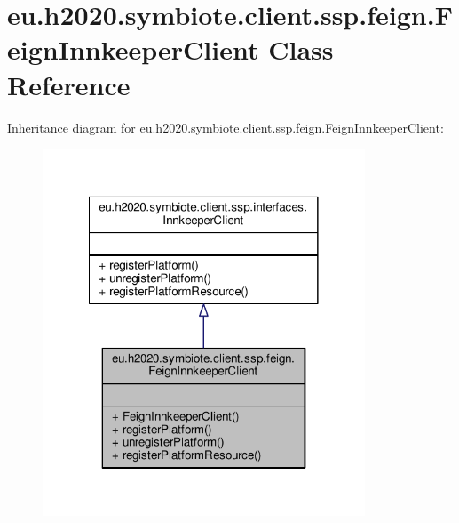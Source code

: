 \hypertarget{classeu_1_1h2020_1_1symbiote_1_1client_1_1ssp_1_1feign_1_1FeignInnkeeperClient}{}\section{eu.\+h2020.\+symbiote.\+client.\+ssp.\+feign.\+Feign\+Innkeeper\+Client Class Reference}
\label{classeu_1_1h2020_1_1symbiote_1_1client_1_1ssp_1_1feign_1_1FeignInnkeeperClient}


Inheritance diagram for eu.\+h2020.\+symbiote.\+client.\+ssp.\+feign.\+Feign\+Innkeeper\+Client\+:\nopagebreak
\begin{figure}[H]
\begin{center}
\leavevmode
\includegraphics[width=272pt]{classeu_1_1h2020_1_1symbiote_1_1client_1_1ssp_1_1feign_1_1FeignInnkeeperClient__inherit__graph}
\end{center}
\end{figure}


